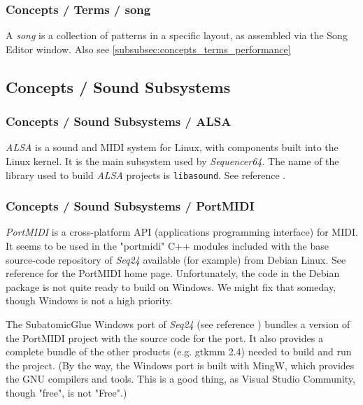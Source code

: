 \subsubsection{Concepts / Terms / song}
\label{subsubsec:concepts_terms_song}

   A \textsl{song} is a collection of patterns in a specific layout, as
   assembled via the Song Editor window.
   Also see \ref{subsubsec:concepts_terms_performance}

\subsection{Concepts / Sound Subsystems}
\label{subsec:concepts_sound_subsystems}

\subsubsection{Concepts / Sound Subsystems / ALSA}
\label{subsubsec:concepts_sound_alsa}

   \textsl{ALSA} is a sound and MIDI system for Linux, with components built
   into the Linux kernel. It is the main subsystem used by
   \textsl{Sequencer64}.  The name of the library used to build
   \textsl{ALSA} projects is \texttt{libasound}.
   See reference \cite{alsa}.

\subsubsection{Concepts / Sound Subsystems / PortMIDI}
\label{subsubsec:concepts_sound_portmidi}

   \textsl{PortMIDI} is a cross-platform API (applications programming
   interface) for MIDI.  It seems to be used in the "portmidi" C++ modules
   included with the base source-code repository of \textsl{Seq24} available
   (for example) from Debian Linux.  See reference \cite{portmidi}
   for the PortMIDI home page.  Unfortunately, the code in the Debian
   package is not quite ready to build on Windows.  We might fix that
   someday, though Windows is not a high priority.

   The SubatomicGlue Windows port of \textsl{Seq24} (see reference
   \cite{subatomicglue}) bundles a version of the PortMIDI project with the
   source code for the port.  It also provides a complete bundle of the
   other products (e.g. gtkmm 2.4) needed to build and run the project.
   (By the way, the Windows port is built with
   MingW, which provides the GNU compilers and tools.  This is a good thing,
   as Visual Studio Community, though "free", is not "Free".)

